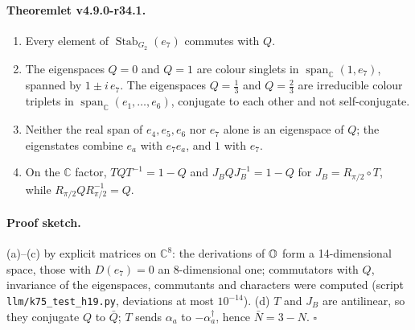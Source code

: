 \paragraph{Theoremlet v4.9.0-r34.1.}
\begin{enumerate}[leftmargin=2em]
\item[(a)] Every element of \(\operatorname{Stab}_{G_2}(e_7)\) commutes with \(Q\).
\item[(b)] The eigenspaces \(Q=0\) and \(Q=1\) are colour singlets in \(\operatorname{span}_{\mathbb C}(1,e_7)\), spanned by
\(1\pm i\,e_7\).  The eigenspaces \(Q=\tfrac13\) and \(Q=\tfrac23\) are irreducible colour triplets in
\(\operatorname{span}_{\mathbb C}(e_1,\dots,e_6)\), conjugate to each other and not self-conjugate.
\item[(c)] Neither the real span of \(e_4,e_5,e_6\) nor \(e_7\) alone is an eigenspace of \(Q\); the eigenstates combine
\(e_a\) with \(e_7e_a\), and \(1\) with \(e_7\).
\item[(d)] On the \(\mathbb C\) factor, \(TQT^{-1}=1-Q\) and \(J_BQJ_B^{-1}=1-Q\) for \(J_B=R_{\pi/2}\circ T\), while
\(R_{\pi/2}QR_{\pi/2}^{-1}=Q\).
\end{enumerate}

\paragraph{Proof sketch.}
(a)--(c) by explicit matrices on \(\mathbb C^8\): the derivations of \(\mathbb{O}\) form a 14-dimensional space, those with
\(D(e_7)=0\) an 8-dimensional one; commutators with \(Q\), invariance of the eigenspaces, commutants and characters were
computed (script \texttt{llm/k75\_test\_h19.py}, deviations at most \(10^{-14}\)).  (d) \(T\) and \(J_B\) are antilinear, so they
conjugate \(Q\) to \(\bar Q\); \(T\) sends \(\alpha_a\) to \(-\alpha_a^\dagger\), hence \(\bar N=3-N\).  \(\square\)

